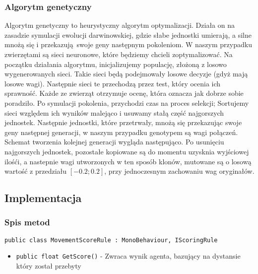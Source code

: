 \documentclass[12pt,a4paper]{article}
\begin{document}
\subsubsection*{Algorytm genetyczny}
Algorytm genetyczny to heurystyczny algorytm optymalizacji. Działa on na zasadzie symulacji ewolucji darwinowskiej, gdzie
słabe jednostki umierają, a silne mnożą się i przekazują swoje geny następnym pokoleniom. W naszym przypadku zwierzętami
są sieci neuronowe, które będziemy chcieli zoptymalizować. Na początku działania algorytmu, inicjalizujemy 
populację, złożoną z losowo wygenerowanych sieci. Takie sieci będą podejmowały losowe decyzje (gdyż mają losowe wagi). Następnie sieci te 
przechodzą przez test, który ocenia ich sprawność. Każde ze zwierząt otrzymuje ocenę, która oznacza jak dobrze sobie poradziło.
Po symulacji pokolenia, przychodzi czas na proces selekcji; Sortujemy sieci względem ich wyników malejąco i usuwamy stałą część najgorszych jednostek.
Następnie jednostki, które przetrwały, mnożą się przekazując swoje geny następnej generacji, w naszym przypadku genotypem są wagi połączeń. Schemat tworzenia kolejnej generacji wygląda następująco. Po usunięciu najgorszych jednostek, pozostałe kopiowane są do momentu uzysknia wyjściowej ilośći, a nastepnie wagi utworzonych w ten sposób klonów, mutowane są o losową wartość z przedziału $[-0.2;0.2]$, przy jednoczesnym zachowaniu wag oryginałów.






\subsection*{Implementacja}
\subsubsection*{Spis metod}
\lstinline{public class MovementScoreRule : MonoBehaviour, IScoringRule}
\begin{itemize}
    \item \lstinline|public float GetScore()| - Zwraca wynik agenta, bazujący na dystansie który został przebyty
\end{itemize}
\end{document}
